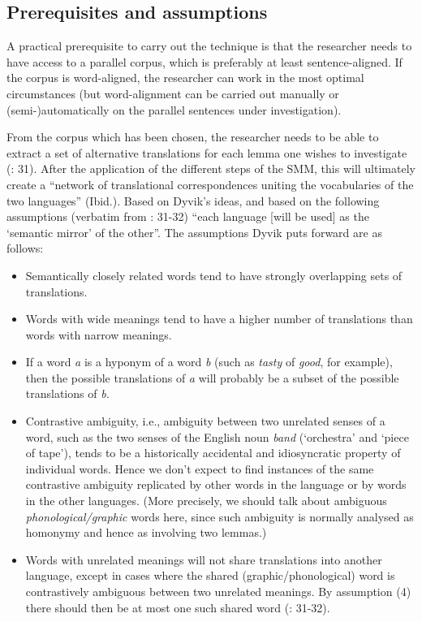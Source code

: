 \subsection{\label{sec:3.4.2}  Prerequisites and assumptions}

A practical prerequisite to carry out the technique is that the researcher needs to have access to a parallel corpus, which is preferably at least sentence-aligned. If the corpus is word-aligned, the researcher can work in the most optimal circumstances (but word-alignment can be carried out manually or (semi-)automatically on the parallel sentences under investigation).



From the corpus which has been chosen, the researcher needs to be able to extract a set of alternative translations for each lemma one wishes to investigate (\citealt{langemets_translations_2005}: 31). After the application of the different steps of the SMM, this will ultimately create a “network of translational correspondences uniting the vocabularies of the two languages” (Ibid.). Based on Dyvik’s ideas, and based on the following assumptions (verbatim from \citealt{langemets_translations_2005}: 31-32) “each language [will be used] as the ‘semantic mirror’ of the other”. The assumptions Dyvik puts forward are as follows:


\begin{itemize}
\item
Semantically closely related words tend to have strongly overlapping sets of translations.
\item
Words with wide meanings tend to have a higher number of translations than words with narrow meanings.
\item
If a word \textit{a} is a hyponym of a word \textit{b} (such as \textit{tasty} of \textit{good}, for example), then the possible translations of \textit{a} will probably be a subset of the possible translations of \textit{b.}
\item
Contrastive ambiguity, i.e., ambiguity between two unrelated senses of a word, such as the two senses of the English noun \textit{band} (‘orchestra’ and ‘piece of tape’), tends to be a historically accidental and idiosyncratic property of individual words. Hence we don’t expect to find instances of the same contrastive ambiguity replicated by other words in the language or by words in the other languages. (More precisely, we should talk about ambiguous \textit{phonological/graphic} words here, since such ambiguity is normally analysed as homonymy and hence as involving two lemmas.)
\item
Words with unrelated meanings will not share translations into another language, except in cases where the shared (graphic/phonological) word is contrastively ambiguous between two unrelated meanings. By assumption (4) there should then be at most one such shared word (\citealt{langemets_translations_2005}: 31-32).
\end{itemize}

